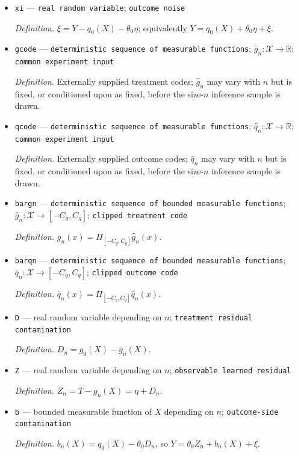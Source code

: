 \documentclass{article}
\begin{document}
\begin{itemize}
  \item \texttt{xi} --- \texttt{real random variable}; \texttt{outcome noise}
  \par\smallskip\noindent\emph{Definition.} \(\xi=Y-q_0(X)-\theta_0\eta\); equivalently \(Y=q_0(X)+\theta_0\eta+\xi\).
  \item \texttt{gcode} --- \texttt{deterministic sequence of measurable functions}; \(\widehat g_n:\mathcal X\to\mathbb R\); \texttt{common experiment input}
  \par\smallskip\noindent\emph{Definition.} Externally supplied treatment codes; \(\widehat g_n\) may vary with \(n\) but is fixed, or conditioned upon as fixed, before the size-\(n\) inference sample is drawn.
  \item \texttt{qcode} --- \texttt{deterministic sequence of measurable functions}; \(\widehat q_n:\mathcal X\to\mathbb R\); \texttt{common experiment input}
  \par\smallskip\noindent\emph{Definition.} Externally supplied outcome codes; \(\widehat q_n\) may vary with \(n\) but is fixed, or conditioned upon as fixed, before the size-\(n\) inference sample is drawn.
  \item \texttt{bargn} --- \texttt{deterministic sequence of bounded measurable functions}; \(\bar g_n:\mathcal X\to[-C_g,C_g]\); \texttt{clipped treatment code}
  \par\smallskip\noindent\emph{Definition.} \(\bar g_n(x)=\Pi_{[-C_g,C_g]}\widehat g_n(x)\).
  \item \texttt{barqn} --- \texttt{deterministic sequence of bounded measurable functions}; \(\bar q_n:\mathcal X\to[-C_q,C_q]\); \texttt{clipped outcome code}
  \par\smallskip\noindent\emph{Definition.} \(\bar q_n(x)=\Pi_{[-C_q,C_q]}\widehat q_n(x)\).
  \item \texttt{D} --- real random variable depending on \(n\); \texttt{treatment residual contamination}
  \par\smallskip\noindent\emph{Definition.} \(D_n=g_0(X)-\bar g_n(X)\).
  \item \texttt{Z} --- real random variable depending on \(n\); \texttt{observable learned residual}
  \par\smallskip\noindent\emph{Definition.} \(Z_n=T-\bar g_n(X)=\eta+D_n\).
  \item \texttt{b} --- bounded measurable function of \(X\) depending on \(n\); \texttt{outcome-\allowbreak{}side contamination}
  \par\smallskip\noindent\emph{Definition.} \(b_n(X)=q_0(X)-\theta_0D_n\), so \(Y=\theta_0Z_n+b_n(X)+\xi\).

\end{itemize}
\end{document}

